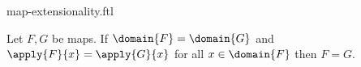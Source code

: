 \documentclass{article}
\begin{document}
\begin{smodule}[creators={Marcel Schütz}]{map-extensionality.ftl}

  \begin{faxiom*}[label=3178654104289280]
    Let $F, G$ be maps.
    If $\domain{F} = \domain{G}$ and $\apply{F}{x} = \apply{G}{x}$ for all $x \in \domain{F}$ then $F = G$.
  \end{faxiom*}
\end{smodule}
\end{document}
